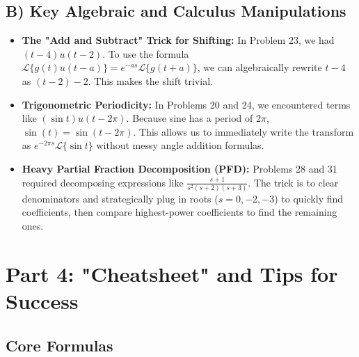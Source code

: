 \documentclass[11pt, letterpaper]{article}
\theoremstyle{definition}
\theoremstyle{remark}
\newcommand{\Lap}{\mathcal{L}}
\begin{document}
\subsection{B) Key Algebraic and Calculus Manipulations}
\begin{itemize}
    \item \textbf{The "Add and Subtract" Trick for Shifting:} In Problem 23, we had $(t-4)u(t-2)$. To use the formula $\Lap\{g(t)u(t-a)\} = e^{-as}\Lap\{g(t+a)\}$, we can algebraically rewrite $t-4$ as $(t-2) - 2$. This makes the shift trivial.
    \item \textbf{Trigonometric Periodicity:} In Problems 20 and 24, we encountered terms like $(\sin t)u(t-2\pi)$. Because sine has a period of $2\pi$, $\sin(t) = \sin(t-2\pi)$. This allows us to immediately write the transform as $e^{-2\pi s}\Lap\{\sin t\}$ without messy angle addition formulas.
    \item \textbf{Heavy Partial Fraction Decomposition (PFD):} Problems 28 and 31 required decomposing expressions like $\frac{s+1}{s^2(s+2)(s+3)}$. The trick is to clear denominators and strategically plug in roots ($s=0, -2, -3$) to quickly find coefficients, then compare highest-power coefficients to find the remaining ones.
\end{itemize}

\section{Part 4: "Cheatsheet" and Tips for Success}

\subsection{Core Formulas}
\renewcommand{\arraystretch}{1.5}
\end{document}
